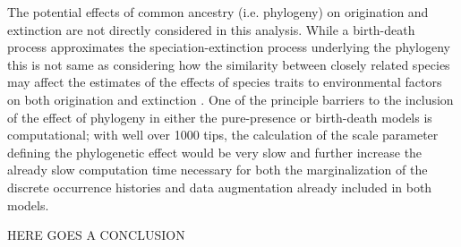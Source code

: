 \documentclass[12pt,letterpaper]{article}
\begin{document}

The potential effects of common ancestry (i.e. phylogeny) on origination and extinction are not directly considered in this analysis. While a birth-death process approximates the speciation-extinction process underlying the phylogeny \citep{Silvestro2014a} this is not same as considering how the similarity between closely related species may affect the estimates of the effects of species traits to environmental factors on both origination and extinction \citep{Smits2015b,Harnik2014}. One of the principle barriers to the inclusion of the effect of phylogeny in either the pure-presence or birth-death models is computational; with well over 1000 tips, the calculation of the scale parameter defining the phylogenetic effect would be very slow and further increase the already slow computation time necessary for both the marginalization of the discrete occurrence histories and data augmentation already included in both models.

\uppercase{here goes a conclusion}
\end{document}
